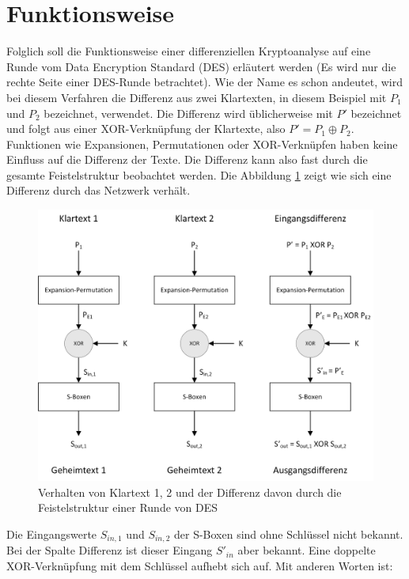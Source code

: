 \clearpage
\section{Funktionsweise}\label{sec:Funktionsweise}
Folglich soll die Funktionsweise einer differenziellen Kryptoanalyse auf eine Runde vom Data Encryption Standard (DES) erläutert werden (Es wird nur die rechte Seite einer DES-Runde betrachtet). 
Wie der Name es schon andeutet, wird bei diesem Verfahren die Differenz aus zwei Klartexten, in diesem Beispiel mit $P_{1}$ und $P_{2}$ bezeichnet, verwendet. Die Differenz wird üblicherweise mit $P'$ bezeichnet und folgt aus einer XOR-Verknüpfung der Klartexte, also $P' = P_{1} \oplus P_{2}$.
Funktionen wie Expansionen, Permutationen oder XOR-Verknüpfen haben keine Einfluss auf die Differenz der Texte. Die Differenz kann also fast durch die gesamte Feistelstruktur beobachtet werden. Die Abbildung \ref{fig:DES_Differenz} zeigt wie sich eine Differenz durch das Netzwerk verhält. 

\begin{figure}[h]
	\centering
	\includegraphics[width=1.0\linewidth]{graphics/DES_Differenz.jpg}
	\caption{Verhalten von Klartext 1, 2 und der Differenz davon durch die Feistelstruktur einer Runde von DES \cite{the_morpheus_tutoials_kryptographie_2016}}
	\label{fig:DES_Differenz}
\end{figure}

Die Eingangswerte $S_{in,1}$ und $S_{in,2}$ der S-Boxen sind ohne Schlüssel nicht bekannt. Bei der Spalte \glqq Differenz\grqq{} ist dieser Eingang $S'_{in}$ aber bekannt. Eine doppelte XOR-Verknüpfung mit dem Schlüssel aufhebt sich auf. Mit anderen Worten ist: 

